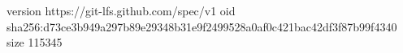version https://git-lfs.github.com/spec/v1
oid sha256:d73ce3b949a297b89e29348b31e9f2499528a0af0c421bac42df3f87b99f4340
size 115345
